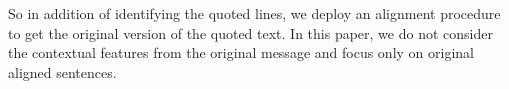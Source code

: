 So in addition of identifying the quoted lines, we deploy an alignment procedure to get the original version of the quoted text. 
In this paper, we do not consider the contextual features from the original message and focus only on original aligned sentences. 















